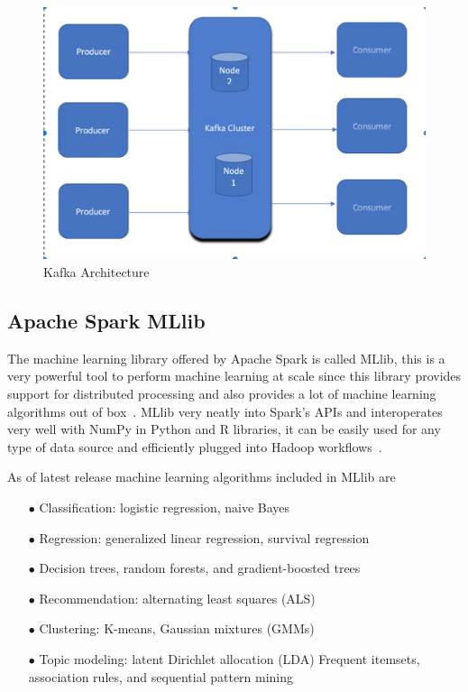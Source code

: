 \begin{figure}[htbp] 
	\centering
	\includegraphics[width=\columnwidth]{images/kafkaarchitecture.jpg}
	\caption{Kafka Architecture}
\label{fig:kafkaarchitecture} 
\end{figure}

\subsection{Apache Spark MLlib}
The machine learning library offered by Apache Spark is called MLlib, this is a very powerful tool to perform machine learning at scale since this library provides support for distributed processing and also provides a lot of machine learning algorithms out of box~\cite{hid-sp18-510-sparkml}. MLlib very neatly into Spark's APIs and interoperates very well with NumPy in Python and R libraries, it can be easily used for any type of data source and efficiently plugged into Hadoop workflows~\cite{hid-sp18-510-apmllib}. 

As of latest release machine learning algorithms included in MLlib are 
\begin{itemize}
\item[$\bullet$] Classification: logistic regression, naive Bayes
\item[$\bullet$] Regression: generalized linear regression, survival regression
\item[$\bullet$] Decision trees, random forests, and gradient-boosted trees
\item[$\bullet$] Recommendation: alternating least squares (ALS)
\item[$\bullet$] Clustering: K-means, Gaussian mixtures (GMMs)
\item[$\bullet$] Topic modeling: latent Dirichlet allocation (LDA)
Frequent itemsets, association rules, and sequential pattern mining
\end{itemize}

